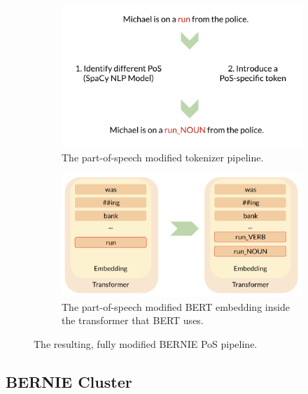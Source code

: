 \documentclass[a4paper,12pt,twoside,openright]{report}
\begin{document}
\begin{figure}
\begin{subfigure}{.5\textwidth}
  \centering
  \includegraphics[width=\linewidth]{./assets/experiments/pipeline_tokenizer_BERnie_POS_sentence.png}
  \caption{The part-of-speech modified tokenizer pipeline.}
  \label{fig:sfig1}
\end{subfigure}%
\hfill
\begin{subfigure}{.55\textwidth}
  \centering
  \includegraphics[width=\linewidth]{./assets/experiments/pipeline_model_BERnie_POS.png}
  \caption{The part-of-speech modified BERT embedding inside the transformer that BERT uses.}
  \label{fig:sfig2}
\end{subfigure}
\caption{The resulting, fully modified BERNIE PoS pipeline.}
\label{fig:BERNIE_POS_full_pipeline}
\end{figure}

\subsection{BERNIE Cluster}\label{experiment_bernie_meaning}
\end{document}
